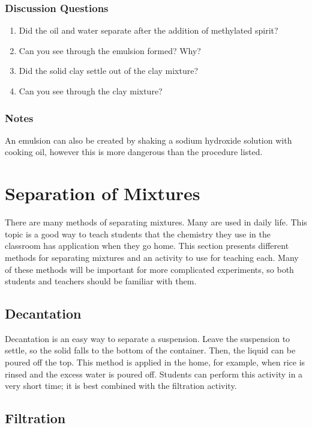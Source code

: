 \subsubsection*{Discussion Questions}
\begin{enumerate}
\item{Did the oil and water separate after the addition of methylated spirit?}
\item{Can you see through the emulsion formed? Why?}
\item{Did the solid clay settle out of the clay mixture?}
\item{Can you see through the clay mixture?}
\end{enumerate}

\subsubsection*{Notes}
An emulsion can also be created by shaking a sodium hydroxide solution with cooking oil, however this is more dangerous than the procedure listed.

\section{Separation of Mixtures}

There are many methods of separating mixtures. Many are used in daily life. This topic is a good way to teach students that the chemistry they use in the classroom has application when they go home. This section presents different methods for separating mixtures and an activity to use for teaching each. Many of these methods will be important for more complicated experiments, so both students and teachers should be familiar with them.

\subsection{Decantation}
Decantation is an easy way to separate a suspension. Leave the suspension to settle, so the solid falls to the bottom of the container. Then, the liquid can be poured off the top. This method is applied in the home, for example, when rice is rinsed and the excess water is poured off. Students can perform this activity in a very short time; it is best combined with the filtration activity.


\subsection{Filtration}

